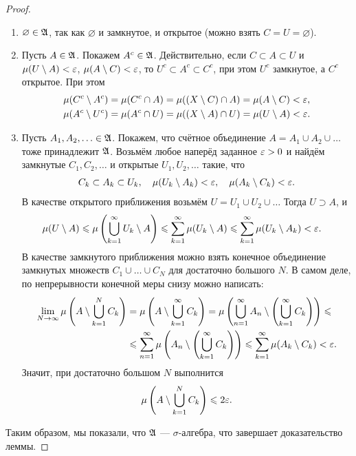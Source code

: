 \begin{proof}
 \begin{enumerate}
  \item $\varnothing \in \mathfrak{A}$, так как $\varnothing$ и замкнутое, и открытое (можно взять $C=U=\varnothing$).
  \item Пусть $A \in \mathfrak{A}$. Покажем $A^{c} \in \mathfrak{A}$. Действительно, если $C \subset A \subset U$ и $\mu(U \setminus A) < \varepsilon$, $\mu(A \setminus C) < \varepsilon$, то $U^{c} \subset A^{c} \subset C^{c}$, при этом $U^{c}$ замкнутое, а $C^{c}$ открытое. При этом 
\begin{align*}
 \mu(C^{c} \setminus A^{c}) &= \mu(C^{c} \cap A) = \mu((X \setminus C) \cap A) = \mu(A \setminus C) < \varepsilon, \\
 \mu(A^{c} \setminus U^{c}) &= \mu(A^{c} \cap U) = \mu((X \setminus A) \cap U) = \mu(U \setminus A) < \varepsilon
.\end{align*}
\item Пусть $A_1, A_2, \ldots \in \mathfrak{A}$. Покажем, что счётное объединение $A = A_1 \cup A_2 \cup \ldots$ тоже принадлежит $\mathfrak{A}$. Возьмём любое наперёд заданное $\varepsilon > 0$ и найдём замкнутые $C_1,C_2,\ldots$ и открытые $U_1,U_2,\ldots$ такие, что
 \begin{align*}
  C_k \subset A_k \subset U_k, \quad \mu(U_k \setminus A_k) < \varepsilon, \quad \mu(A_k \setminus C_k) < \varepsilon
 .\end{align*} В качестве открытого приближения возьмём $U = U_1 \cup U_2 \cup \ldots$ Тогда $U \supset A$, и \begin{align*}
 \mu(U \setminus A) &\leqslant \mu \left( \bigcup_{k=1}^{\infty} U_k \setminus A \right) \leqslant \sum_{k=1}^{\infty} \mu(U_k \setminus A) \leqslant \sum_{k=1}^{\infty} \mu(U_k \setminus A_k) < \varepsilon 
.\end{align*}
В качестве замкнутого приближения можно взять конечное объединение замкнутых множеств $C_1 \cup \ldots \cup C_N$ для достаточно большого $N$. В самом деле, по непрерывности конечной меры снизу можно написать:
\begin{align*}
 \lim_{N \to \infty} \mu \left( A \setminus \bigcup_{k=1}^{N} C_k \right) &= \mu \left( A \setminus \bigcup_{k=1}^{\infty} C_k \right) = \mu \left( \bigcup_{n=1}^{\infty} A_n \setminus \left( \bigcup_{k=1}^{\infty} C_k \right) \right) \leqslant \\ &\leqslant \sum_{n=1}^{\infty} \mu \left( A_n \setminus \left( \bigcup_{k=1}^{\infty} C_k \right) \right) \leqslant \sum_{k=1}^{\infty} \mu(A_k \setminus C_k) < \varepsilon
.\end{align*} Значит, при достаточно большом $N$ выполнится \begin{align*}
 \mu \left( A \setminus \bigcup_{k=1}^{N} C_k \right) \leqslant 2\varepsilon
.\end{align*}
\end{enumerate} Таким образом, мы показали, что $\mathfrak{A}$ --- $\sigma$-алгебра, что завершает доказательство леммы.
\end{proof}

